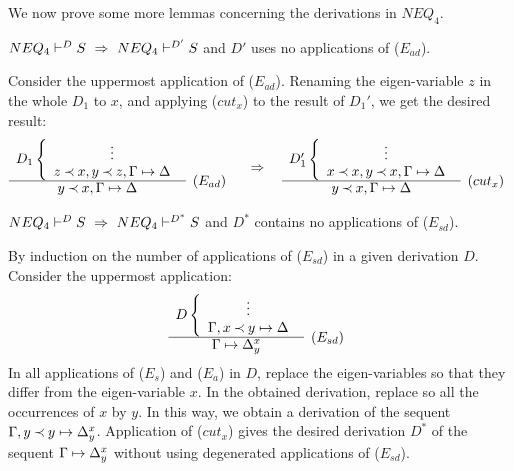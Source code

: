 \noindent
We now prove some more lemmas concerning the derivations in $NEQ_4$.
\begin{LEMMA}\label{le:noEad}
 ${NEQ_4}\vdash^{{D}}S\ \mathrel\Rightarrow\ {NEQ_4}\vdash^{{D'}}S$ and $D'$ uses no applications of ($E_{ad}$).
\end{LEMMA}
\begin{PROOF}
Consider the uppermost application of ($E_{ad}$).
Renaming the eigen-variable $z$ in the whole $D_1$ to $x$, and applying ($cut_x$)
to the result of $D_1'$, we get the desired result:
\[ \begin{array}{cl}
D_1 \left \{ \begin{array}{c}
 \vdots \\
 z\Incl x, y\Incl z, \Gamma\Seq\Delta \end{array} \right . \\ \cline{1-1}
 y \Incl x, \Gamma\Seq\Delta & \raisebox{1.2ex}[1.5ex][0ex]{$(E_{ad})$}
\end{array} 
\conv
\begin{array}{cl}
D_1' \left \{ \begin{array}{c}
 \vdots \\
 x\Incl x, y\Incl x, \Gamma\Seq\Delta \end{array} \right . \\ \cline{1-1}
 y \Incl x, \Gamma\Seq\Delta & \raisebox{1.2ex}[1.5ex][0ex]{$(cut_x)$}
\end{array} \]
\end{PROOF}

\begin{LEMMA}\label{le:noEsd} ${NEQ_4}\vdash^{{D}}S\ \mathrel\Rightarrow\ {NEQ_4}\vdash^{{D^*}}S$
and $D^*$ contains no applications of ($E_{sd}$).
\end{LEMMA}
\begin{PROOF}
By induction on the number of applications of ($E_{sd}$) in a given
derivation $D$. Consider the uppermost application:
\[ \begin{array}{cl}
D\left\{ \begin{array}{c}
 \vdots \\
 \Gamma,x\Incl y\Seq\Delta \end{array} \right. \\ \cline{1-1}
 \Gamma\Seq\Delta_y^x  &  \raisebox{1.2ex}[1.5ex][0ex]{($E_{sd}$)}
\end{array} \]
In all applications of ($E_s$) and ($E_a$) in $D$, replace the
eigen-variables so that they differ from the eigen-variable $x$. In the obtained
derivation, replace so all the occurrences of $x$ by $y$. In this way, we 
obtain a derivation of the sequent $\Gamma,y\mathbin{\prec} y\mathrel{\mapsto}\Delta_y^x$. 
Application of ($cut_x$) gives the desired derivation $D^*$ of the
sequent $\Gamma\mathrel{\mapsto}\Delta_y^x$ 
without using degenerated applications of ($E_{sd}$).
\end{PROOF}
%
%

